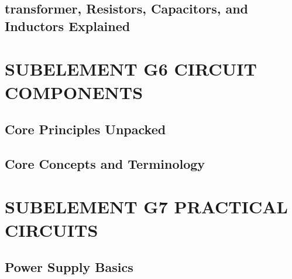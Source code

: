 \documentclass[12pt]{book}
\begin{document}
\section{transformer, Resistors, Capacitors, and Inductors Explained}














\chapter{SUBELEMENT G6  CIRCUIT COMPONENTS}
\section{Core Principles Unpacked}












\section{Core Concepts and Terminology}











\chapter{SUBELEMENT G7  PRACTICAL CIRCUITS}
\section{Power Supply Basics}













\end{document}
